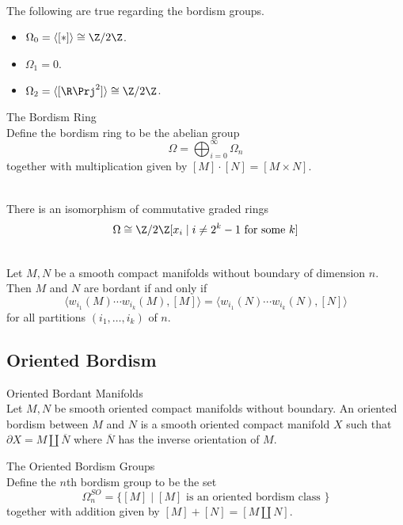 \documentclass[a4paper]{article}
\begin{document}
\begin{prp}{}{}\\
The following are true regarding the bordism groups. 
\begin{itemize}
\item $\Omega_0=\langle[\ast]\rangle\cong\Z/2\Z$. 
\item $\Omega_1=0$. 
\item $\Omega_2=\langle[\R\Prj^2]\rangle\cong\Z/2\Z$. 
\end{itemize}
\end{prp}

\begin{defn}{The Bordism Ring}{}\\
Define the bordism ring to be the abelian group $$\Omega=\bigoplus_{i=0}^\infty\Omega_n$$ together with multiplication given by $[M]\cdot[N]=[M\times N]$. 
\end{defn}

\begin{prp}{}{}\\
There is an isomorphism of commutative graded rings $$\Omega\cong\Z/2\Z[x_i\;|\;i\neq 2^k-1\text{ for some }k]$$
\end{prp}

\begin{prp}{}{}\\
Let $M,N$ be a smooth compact manifolds without boundary of dimension $n$. Then $M$ and $N$ are bordant if and only if $$\langle w_{i_1}(M)\cdots w_{i_k}(M),[M]\rangle=\langle w_{i_1}(N)\cdots w_{i_k}(N),[N]\rangle$$ for all partitions $(i_1,\dots,i_k)$ of $n$. 
\end{prp}

\subsection{Oriented Bordism}
\begin{defn}{Oriented Bordant Manifolds}{}\\
Let $M,N$ be smooth oriented compact manifolds without boundary. An oriented bordism between $M$ and $N$ is a smooth oriented compact manifold $X$ such that $\partial X=M\amalg\overline{N}$ where $\overline{N}$ has the inverse orientation of $M$. 
\end{defn}

\begin{defn}{The Oriented Bordism Groups}{}\\
Define the $n$th bordism group to be the set $$\Omega_n^{SO}=\{[M]\;|\;[M]\text{ is an oriented bordism class }\}$$ together with addition given by $[M]+[N]=[M\amalg N]$. 
\end{defn}
\end{document}
